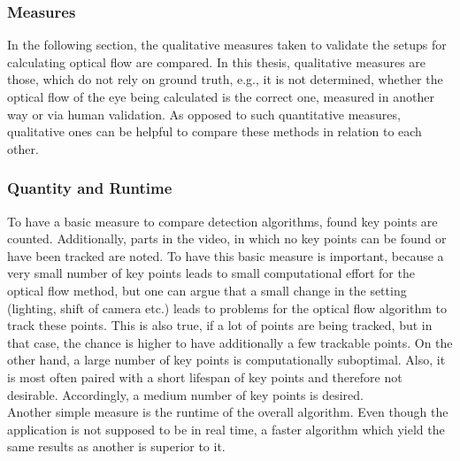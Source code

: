 \documentclass[Bachelorarbeit.tex]{subfiles}
\begin{document}
\subsubsection{Measures}
In the following section, the qualitative measures taken to validate the setups for calculating optical flow are compared. In this thesis, qualitative measures are those, which do not rely on ground truth, e.g., it is not determined, whether the optical flow of the eye being calculated is the correct one, measured in another way or via human validation. As opposed to such quantitative measures, qualitative ones can be helpful to compare these methods in relation to each other.

\subsubsection*{Quantity and Runtime}
\label{quan}
To have a basic measure to compare detection algorithms, found key points are counted. Additionally, parts in the video, in which no key points can be found or have been tracked are noted. To have this basic measure is important, because a very small number of key points leads to small computational effort for the optical flow method, but one can argue that a small change in the setting (lighting, shift of camera etc.) leads to problems for the optical flow algorithm to track these points. This is also true, if a lot of points are being tracked, but in that case, the chance is higher to have additionally a few trackable points. On the other hand, a large number of key points is computationally suboptimal. Also, it is most often paired with a short lifespan of key points and therefore not desirable. Accordingly, a medium number of key points is desired. \\
Another simple measure is the runtime of the overall algorithm. Even though the application is not supposed to be in real time, a faster algorithm which yield the same results as another is superior to it.


\end{document}

